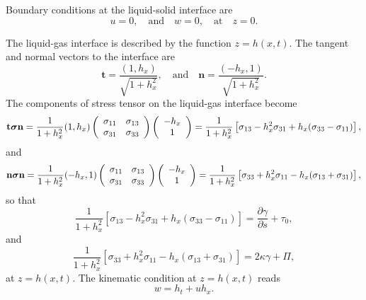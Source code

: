 \documentclass[%
 amsmath,amssymb,
 aps,
10.5pt]{revtex4-2}
\def\bm#1{\mbox{\boldmath{$#1$}}}
\newcommand{\be}{\begin{equation}}
\newcommand{\ee}{\end{equation}}
\begin{document}
Boundary conditions at the liquid-solid interface are 
\be \label{solidbc1}
u = 0, \quad \textrm{and} \quad w=0, \quad \textrm{at} \quad z=0.
\ee

The liquid-gas interface is described by the function $z=h(x,t)$. The tangent and normal vectors to the interface are 
\be
\mathbf{t} = \frac{(1,h_x)}{\sqrt{1 + h^2_x}}, \quad \textrm{and}\quad \mathbf{n} = \frac{(-h_x,1)}{\sqrt{1 + h^2_x}}.
\ee
The components of stress tensor on the liquid-gas interface become
\be \label{tsn}
\mathbf{t} \bm{\sigma}\mathbf{n} = \frac{1}{1+h_x^2} (1,h_x)
\left( \begin{array}{cc}
\sigma_{11} & \sigma_{13} \\
\sigma_{31} & \sigma_{33}
\end{array}
\right)\left( \begin{array}{c}
-h_x \\ 1
\end{array} \right) = \frac{1}{1+h_x^2} \left[ \sigma_{13} - h_x^2 \sigma_{31} + h_x ( \sigma_{33} - \sigma_{11} ) \right],
\ee
and 
\be \label{nsn}
\mathbf{n} \bm{\sigma} \mathbf{n} = \frac{1}{1+h_x^2} (-h_x,1)
\left( \begin{array}{cc}
\sigma_{11} & \sigma_{13} \\
\sigma_{31} & \sigma_{33}
\end{array}
\right) 
\left( \begin{array}{c}
-h_x \\ 1
\end{array} \right) = \frac{1}{1+h_x^2} \left[ \sigma_{33} + h_x^2 \sigma_{11} - h_x ( \sigma_{13} + \sigma_{31} ) \right], 
\ee
so that
\be\label{freebc2a}
\frac{1}{1+h_x^2} \left[ \sigma_{13} - h_x^2 \sigma_{31} + h_x ( \sigma_{33} - \sigma_{11} ) \right]= \frac{\partial \gamma}{\partial s} + \tau_0,
\ee
and
\be
 \frac{1}{1+h_x^2} \left[ \sigma_{33} + h_x^2 \sigma_{11} - h_x ( \sigma_{13} + \sigma_{31} ) \right]=
2\kappa \gamma + \Pi, \label{freebc2b} 
\ee
at $z=h(x,t)$.  
The kinematic condition at $z=h(x,t)$ reads
\be \label{kinematic1}
w = h_t + u h_x.
\ee
\end{document}
